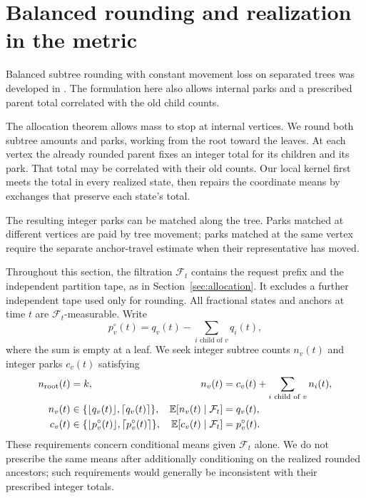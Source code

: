 \section{Balanced rounding and realization in the metric}\label{sec:rounding}

Balanced subtree rounding with constant movement loss on separated trees
was developed in \cite[Section~5.2]{BBMN15}. The formulation here also
allows internal parks and a prescribed parent total correlated with the
old child counts.

The allocation theorem allows mass to stop at internal vertices.  We round
both subtree amounts and parks, working from the root toward the leaves.
At each vertex the already rounded parent fixes an integer total for its
children and its park.  That total may be correlated with their old counts.
Our local kernel first meets the total in every realized state, then repairs
the coordinate means by exchanges that preserve each state's total.

The resulting integer parks can be matched along the tree.  Parks matched
at different vertices are paid by tree movement; parks matched at the same
vertex require the separate anchor-travel estimate when their representative
has moved.

Throughout this section, the filtration $\mathcal F_t$ contains the request
prefix and the independent partition tape, as in Section~\ref{sec:allocation}.
It excludes a further independent tape used only for rounding.  All fractional
states and anchors at time $t$ are $\mathcal F_t$-measurable.  Write
\[
 p_v^\circ(t)=q_v(t)-\sum_{i\text{ child of }v}q_i(t),
\]
where the sum is empty at a leaf.  We seek integer subtree counts $n_v(t)$ and
integer parks $c_v(t)$ satisfying
\begin{equation}\label{eq:rounding-invariants}
 \begin{aligned}
 n_{\rm root}(t)&=k,&
 n_v(t)&=c_v(t)+\sum_{i\text{ child of }v}n_i(t),\\
 n_v(t)&\in\{\lfloor q_v(t)\rfloor,\lceil q_v(t)\rceil\},&
 \mathbb E[n_v(t)\mid\mathcal F_t]&=q_v(t),\\
 c_v(t)&\in\{\lfloor p_v^\circ(t)\rfloor,
                    \lceil p_v^\circ(t)\rceil\},&
 \mathbb E[c_v(t)\mid\mathcal F_t]&=p_v^\circ(t).
 \end{aligned}
\end{equation}
These requirements concern conditional means given $\mathcal F_t$ alone.
We do not prescribe the same means after additionally conditioning on the
realized rounded ancestors; such requirements would generally be inconsistent
with their prescribed integer totals.

